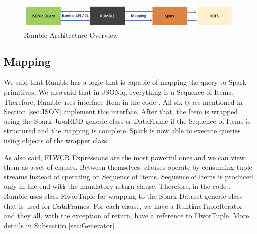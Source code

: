 \begin{figure}[h!]
	\includegraphics[width=\linewidth]{rumble_architecture.png}
	\caption{Rumble Architecture Overview}
	\label{fig:Rumble_Architecture}
\end{figure}

\subsection{Mapping}
\label{sec:RumbleMapping}
We said that Rumble has a logic that is capable of mapping the query to Spark primitives. We also said that in JSONiq, everything is a Sequence of Items. Therefore, Rumble uses interface Item in the code \cite{RumbleRepository}. All six types mentioned in Section \ref{sec:JSON} implement this interface. After that, the Item is wrapped using the Spark JavaRDD generic class or DataFrame if the Sequence of Items is structured and the mapping is complete. Spark is now able to execute queries using objects of the wrapper class.

As also said, FLWOR Expressions are the most powerful ones and we can view them as a set of clauses. Between themselves, clauses operate by consuming tuple streams instead of operating on Sequence of Items. Sequence of Items is produced only in the end with the mandatory return clause. Therefore, in the code \cite{RumbleRepository}, Rumble uses class FlworTuple for wrapping to the Spark Dataset generic class that is used for DataFrames. For each clause, we have a RuntimeTupleIterator and they all, with the exception of return, have a reference to FlworTuple. More details in Subsection \ref{sec:Generator}.

